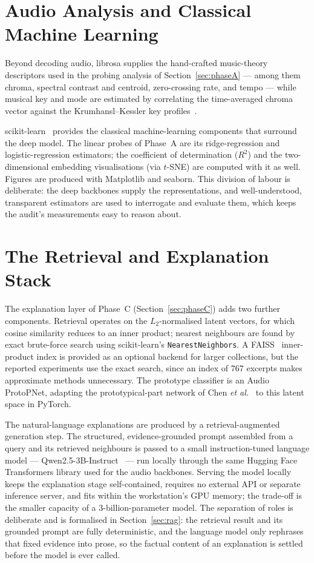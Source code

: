\documentclass[12pt]{report}
\begin{document}
\section{Audio Analysis and Classical Machine Learning}

Beyond decoding audio, librosa supplies the hand-crafted music-theory descriptors used in the probing analysis of Section~\ref{sec:phaseA} --- among them chroma, spectral contrast and centroid, zero-crossing rate, and tempo --- while musical key and mode are estimated by correlating the time-averaged chroma vector against the Krumhansl--Kessler key profiles~\cite{krumhansl_kessler_1982}.

scikit-learn~\cite{pedregosa_scikitlearn_2011} provides the classical machine-learning components that surround the deep model. The linear probes of Phase~A are its ridge-regression and logistic-regression estimators; the coefficient of determination ($R^{2}$) and the two-dimensional embedding visualisations (via $t$-SNE) are computed with it as well. Figures are produced with Matplotlib and seaborn. This division of labour is deliberate: the deep backbones supply the representations, and well-understood, transparent estimators are used to interrogate and evaluate them, which keeps the audit's measurements easy to reason about.

\section{The Retrieval and Explanation Stack}

The explanation layer of Phase~C (Section~\ref{sec:phaseC}) adds two further components. Retrieval operates on the $L_{2}$-normalised latent vectors, for which cosine similarity reduces to an inner product; nearest neighbours are found by exact brute-force search using scikit-learn's \texttt{NearestNeighbors}. A FAISS~\cite{douze_faiss_2024} inner-product index is provided as an optional backend for larger collections, but the reported experiments use the exact search, since an index of $767$ excerpts makes approximate methods unnecessary. The prototype classifier is an Audio ProtoPNet, adapting the prototypical-part network of Chen \emph{et al.}~\cite{chen_protopnet_2019} to this latent space in PyTorch.

The natural-language explanations are produced by a retrieval-augmented generation step. The structured, evidence-grounded prompt assembled from a query and its retrieved neighbours is passed to a small instruction-tuned language model --- Qwen2.5-3B-Instruct~\cite{qwen2_5_2024} --- run locally through the same Hugging Face Transformers library used for the audio backbones. Serving the model locally keeps the explanation stage self-contained, requires no external API or separate inference server, and fits within the workstation's GPU memory; the trade-off is the smaller capacity of a $3$-billion-parameter model. The separation of roles is deliberate and is formalised in Section~\ref{sec:rag}: the retrieval result and its grounded prompt are fully deterministic, and the language model only rephrases that fixed evidence into prose, so the factual content of an explanation is settled before the model is ever called.
\end{document}

